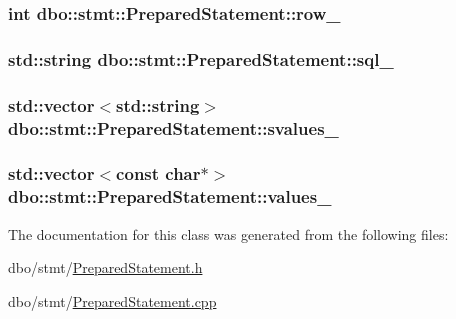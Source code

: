 \hypertarget{classdbo_1_1stmt_1_1_prepared_statement_a65f197eaa23cb862ac56009d8ca18e60}{
\subsubsection[{row\+\_\+}]{\setlength{\rightskip}{0pt plus 5cm}int dbo\+::stmt\+::\+Prepared\+Statement\+::row\+\_\+\hspace{0.3cm}{\ttfamily [protected]}}}\label{classdbo_1_1stmt_1_1_prepared_statement_a65f197eaa23cb862ac56009d8ca18e60}
\hypertarget{classdbo_1_1stmt_1_1_prepared_statement_af86636880d2769856602206df3f6b745}{
\subsubsection[{sql\+\_\+}]{\setlength{\rightskip}{0pt plus 5cm}std\+::string dbo\+::stmt\+::\+Prepared\+Statement\+::sql\+\_\+\hspace{0.3cm}{\ttfamily [protected]}}}\label{classdbo_1_1stmt_1_1_prepared_statement_af86636880d2769856602206df3f6b745}
\hypertarget{classdbo_1_1stmt_1_1_prepared_statement_a312b978fcd4467e19aba95f944d9e76c}{
\subsubsection[{svalues\+\_\+}]{\setlength{\rightskip}{0pt plus 5cm}std\+::vector$<$std\+::string$>$ dbo\+::stmt\+::\+Prepared\+Statement\+::svalues\+\_\+\hspace{0.3cm}{\ttfamily [protected]}}}\label{classdbo_1_1stmt_1_1_prepared_statement_a312b978fcd4467e19aba95f944d9e76c}
\hypertarget{classdbo_1_1stmt_1_1_prepared_statement_a125336886e5cd1e39fd5711b0c91c902}{
\subsubsection[{values\+\_\+}]{\setlength{\rightskip}{0pt plus 5cm}std\+::vector$<$const char$\ast$$>$ dbo\+::stmt\+::\+Prepared\+Statement\+::values\+\_\+\hspace{0.3cm}{\ttfamily [protected]}}}\label{classdbo_1_1stmt_1_1_prepared_statement_a125336886e5cd1e39fd5711b0c91c902}


The documentation for this class was generated from the following files\+:\begin{DoxyCompactItemize}
\item 
dbo/stmt/\hyperlink{_prepared_statement_8h}{Prepared\+Statement.\+h}\item 
dbo/stmt/\hyperlink{_prepared_statement_8cpp}{Prepared\+Statement.\+cpp}\end{DoxyCompactItemize}
